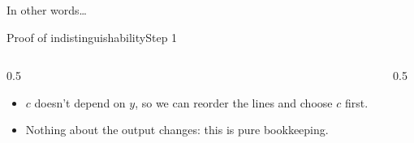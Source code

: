 \ifdefined\PRESENTATION\else\PassOptionsToClass{handout}{beamer}\fi\documentclass[aspectratio=169, lualatex]{beamer}
\begin{document}
\begin{frame}{In other words\ldots}
	\begin{center}
	\end{center}
\end{frame}

\begin{frame}{Proof of indistinguishability}{Step 1}
	\begin{columns}[c]
		\begin{column}{0.5\textwidth}
			\begin{itemize}[<+->]
				\item $c$ doesn't depend on $y$, so we can reorder the lines and choose $c$ first.
				\item Nothing about the output changes: this is pure bookkeeping.
			\end{itemize}
		\end{column}
		\begin{column}{0.5\textwidth}
			\begin{center}
			\end{center}
		\end{column}
	\end{columns}
\end{frame}
\end{document}
